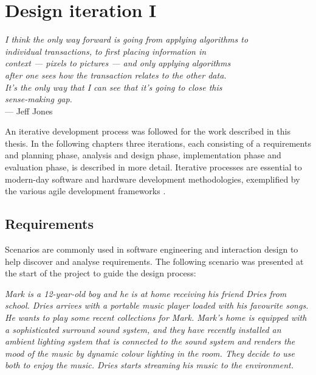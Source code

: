 \chapter{Design iteration I}
\label{DesignIteration1}

\begin{flushright}{\slshape    
I think the only way forward is going from applying algorithms to\\
individual transactions, to first placing information in \\
context --- pixels to pictures --- and only applying algorithms \\
after one sees how the transaction relates to the other data.\\
It's the only way that I can see that it's going to close this\\
 sense-making gap.} \\ \medskip
    --- Jeff Jones \cite{AlexWoodie}
\end{flushright}



An iterative development process was followed for the work described in this thesis. In the following chapters three iterations, each consisting of a requirements and planning phase, analysis and design phase, implementation phase and evaluation phase, is described in more detail. Iterative processes are essential to modern-day software and hardware development methodologies, exemplified by the various agile development frameworks \cite{Larman2003}.

\section{Requirements}

Scenarios are commonly used in software engineering and interaction design to help discover and analyse requirements. The following scenario was presented at the start of the project to guide the design process:

\emph{Mark is a 12-year-old boy and he is at home receiving his friend Dries from school. Dries arrives with a portable music player loaded with his favourite songs. He wants to play some recent collections for Mark. Mark's home is equipped with a sophisticated surround sound system, and they have recently installed an ambient lighting system that is connected to the sound system and renders the mood of the music by dynamic colour lighting in the room. They decide to use both to enjoy the music. Dries starts streaming his music to the environment.}

